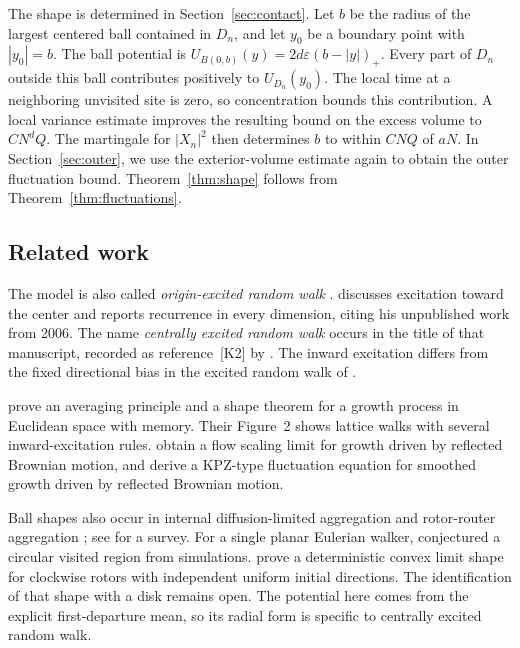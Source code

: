 \documentclass[11pt]{amsart}
\theoremstyle{plain}
\theoremstyle{definition}
\newcommand{\eps}{\varepsilon}
\begin{document}
The shape is determined in Section~\ref{sec:contact}.
Let $b$ be the radius of the largest centered ball contained in $D_n$,
and let $y_0$ be a boundary point with $|y_0|=b$.
The ball potential is $U_{B(0,b)}(y)=2d\eps(b-|y|)_+$.
Every part of $D_n$ outside this ball contributes positively to
$U_{D_n}(y_0)$. The local time at a neighboring unvisited site is zero,
so concentration bounds this contribution. A local variance estimate
improves the resulting bound on the excess volume to $CN^dQ$.
The martingale for $|X_n|^2$ then determines $b$ to within $CNQ$ of $aN$.
In Section~\ref{sec:outer}, we use the exterior-volume estimate again
to obtain the outer fluctuation bound. Theorem~\ref{thm:shape} follows
from Theorem~\ref{thm:fluctuations}.

\subsection{Related work}

The model is also called \emph{origin-excited random walk}
\citep[Introduction]{DemboGroismanHuangSidoravicius2021}.
\citet[Section~2]{Kozma2013} discusses excitation toward the center
and reports recurrence in every dimension, citing his unpublished
work from 2006. The name \emph{centrally excited random walk} occurs
in the title of that manuscript, recorded as reference~[K2] by
\citet{DemboHuangSidoravicius2014}.
The inward excitation differs from the fixed directional bias in the
excited random walk of \citet{BenjaminiWilson2003}.

\citet*[Theorems~1.4 and~1.9]{DemboGroismanHuangSidoravicius2021}
prove an averaging principle and a shape theorem for a growth process
in Euclidean space with memory. Their Figure~2 shows lattice walks
with several inward-excitation rules.
\citet{DemboYang2025Flow} obtain a
flow scaling limit for growth driven by reflected Brownian motion, and
\citet{DemboYang2025KPZ} derive a KPZ-type fluctuation equation for
smoothed growth driven by reflected Brownian motion.

Ball shapes also occur in internal diffusion-limited aggregation
\citep{LawlerBramsonGriffeath1992} and rotor-router aggregation
\citep{LevinePeres2009}; see
\citet{LevinePeres2017} for a survey.
For a single planar Eulerian walker, \citet{KapriDhar2009}
conjectured a circular visited region from simulations.
\citet[Theorem~1.1]{BouRabeePeres2026} prove a deterministic convex
limit shape for clockwise rotors with independent uniform initial
directions. The identification of that shape with a disk remains open.
The potential here comes from the explicit first-departure mean,
so its radial form is specific to centrally excited random walk.
\end{document}
